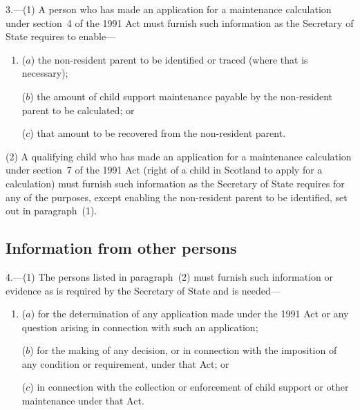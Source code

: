 \documentclass[12pt,a4paper]{article}
\begin{document}
3.---(1)  A person who has made an application for a maintenance calculation under section~4 of the 1991 Act must furnish such information as the 
Secretary of State  %
requires to enable—
\begin{enumerate}\item[]
($a$) the non-resident parent to be identified or traced (where that is necessary);

($b$) the amount of child support maintenance payable by the non-resident parent to be calculated; or

($c$) that amount to be recovered from the non-resident parent.
\end{enumerate}

(2) A qualifying child who has made an application for a maintenance calculation under section~7 of the 1991 Act (right of a child in Scotland to apply for a calculation) must furnish such information as the 
Secretary of State  %
requires for any of the purposes, except enabling the non-resident parent to be identified, set out in paragraph~(1).


\subsection[4. Information from other persons]{Information from other persons}

4.---(1)  The persons listed in paragraph~(2) must furnish such information or evidence as is required by the 
Secretary of State  %
and is needed—
\begin{enumerate}\item[]
($a$) for the determination of any application made under the 1991 Act or any question arising in connection with such an application;

($b$) for the making of any decision, or in connection with the imposition of any condition or requirement, under that Act; or

($c$) in connection with the collection or enforcement of child support or other maintenance under that Act.
\end{enumerate}
\end{document}
